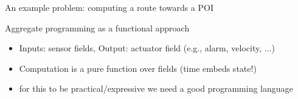 \documentclass[8pt, aspectratio=169, handout]{beamer}
\begin{document}
\begin{frame}{An example problem: computing a route towards a POI}
  \centering
\end{frame}

\begin{frame}{Aggregate programming as a functional approach}
  \begin{card}
    \begin{itemize}
      \item Inputs: sensor fields, Output: actuator field (e.g., alarm, velocity, ...)
      \item Computation is a pure function over fields (time embeds state!)
      \item[\faArrowRight] for this to be practical/expressive we need a good programming language
    \end{itemize}
  \end{card}
  \centering
\end{frame}
\end{document}
